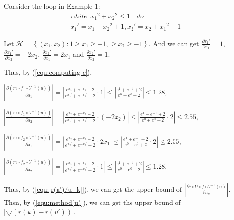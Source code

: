 \begin{exam}\label{exm4}
	Consider the loop in Example 1:
	$$\begin{array}{l}
	while\;\;{x_1}^2 + {x_2}^2 \le 1\quad do\\
	{{x_1}'} = {x_1} - {x_2}^2 + 1,{{x_2}'} = {x_2} + {x_1}^2 - 1
	\end{array}$$
	
	Let $\mathcal{H} =\left\{ {({x_1},{x_2}):1 \ge {x_1} \ge -1,\ge {x_2} \ge -1} \right\}$. And we can get $\frac{{\partial {{x_1}'}}}{{\partial {x_1}}} = 1$, $\frac{{\partial {{x_1}'}}}{{\partial {x_2}}} = -2x_2$, $\frac{{\partial {{x_2}'}}}{{\partial {x_1}}} = 2x_1$ and $\frac{{\partial {{x_2}'}}}{{\partial {x_2}}} = 1$. 
	
	Thus, by (\ref{equ:computing c}),
	
	$\left| {\frac{{\partial (m \circ {f_1} \circ {U^{ - 1}}(u))}}{{\partial {u_1}}}} \right| = \left| {\frac{{{e^{{x_1}}} + {e^{ - {x_1}}} + 2}}{{{e^{{x_1}^\prime }} + {e^{ - {x_1}^\prime }} + 2}}\cdot1} \right| \le \left| {\frac{{{e^1} + {e^{ - 1}} + 2}}{{{e^0} + {e^0} + 2}}} \right| \le 1.28,$
	
	$\left| {\frac{{\partial (m \circ {f_1} \circ {U^{ - 1}}(u))}}{{\partial {u_2}}}} \right| = \left| {\frac{{{e^{{x_2}}} + {e^{ - {x_2}}} + 2}}{{{e^{{x_1}^\prime }} + {e^{ - {x_1}^\prime }} + 2}} \cdot ( - 2{x_2})} \right| \le \left| {\frac{{{e^1} + {e^{ - 1}} + 2}}{{{e^0} + {e^0} + 2}} \cdot 2} \right| \le 2.55,$
	
	$\left| {\frac{{\partial (m \circ {f_2} \circ {U^{ - 1}}(u))}}{{\partial {u_1}}}} \right| = \left| {\frac{{{e^{{x_2}}} + {e^{ - {x_2}}} + 2}}{{{e^{{x_2}^\prime }} + {e^{ - {x_2}^\prime }} + 2}} \cdot 2{x_1}} \right| \le \left| {\frac{{{e^1} + {e^{ - 1}} + 2}}{{{e^0} + {e^0} + 2}} \cdot 2} \right| \le 2.55,$
	
	$\left| {\frac{{\partial (m \circ {f_2} \circ {U^{ - 1}}(u))}}{{\partial {u_2}}}} \right| = \left| {\frac{{{e^{{x_1}}} + {e^{ - {x_1}}} + 2}}{{{e^{{x_2}^\prime }} + {e^{ - {x_2}^\prime }} + 2}} \cdot 1} \right| \le \left| {\frac{{{e^1} + {e^{ - 1}} + 2}}{{{e^0} + {e^0} + 2}}} \right| \le 1.28.$
	
	Thus, by (\ref{equ:|r(u')/u_k|}), we can get the upper bound of $\left| {\frac{{\partial r \circ U \circ f \circ {U^{ - 1}}(u)}}{{\partial {u_k}}}} \right|$. Then, by (\ref{equ:method(u)}), we can get the upper bound of  $\left| \bigtriangledown{(r(u) - r(u'))} \right|$.
	
\end{exam}

